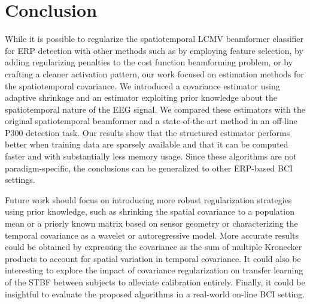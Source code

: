 	\section{Conclusion}
	While it is possible to regularize the spatiotemporal LCMV beamformer
	classifier for ERP detection with other methods such as by employing feature selection,
	by adding regularizing penalties to the cost
	function beamforming problem, or by crafting a cleaner activation pattern, our work focused on
	estimation methods for the spatiotemporal covariance.
	We introduced a covariance estimator using adaptive shrinkage and an
	estimator exploiting prior knowledge about the spatiotemporal nature of the EEG
	signal.
	We compared these estimators with the original spatiotemporal
	beamformer and a state-of-the-art method in an off-line P300 detection task.
	Our results show that the structured estimator performs better when training data are sparsely available and that it can be computed faster and with substantially less memory usage.
	Since these algorithms are not paradigm-specific,  the conclusions can be generalized to
	other ERP-based BCI settings.

	Future work should focus on introducing more robust regularization strategies using prior knowledge, such as shrinking the spatial covariance to a population mean or a priorly known matrix based on sensor geometry or characterizing the temporal covariance as a wavelet or autoregressive model.
	More accurate results could be obtained by expressing the covariance as the sum of multiple Kronecker products to account for spatial variation in temporal
	covariance.
	It could also be interesting to explore the impact of covariance regularization on transfer learning of the STBF between subjects to alleviate calibration entirely.
	Finally, it could be insightful to evaluate the proposed algorithms in a
	real-world on-line BCI setting.



